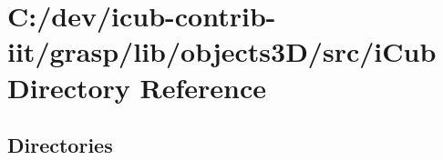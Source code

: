 \section{C\+:/dev/icub-\/contrib-\/iit/grasp/lib/objects3\+D/src/i\+Cub Directory Reference}
\label{dir_6a80ef9a16593e3ddd9f3cb2b7a23088}
\subsection*{Directories}
\begin{DoxyCompactItemize}
\end{DoxyCompactItemize}
